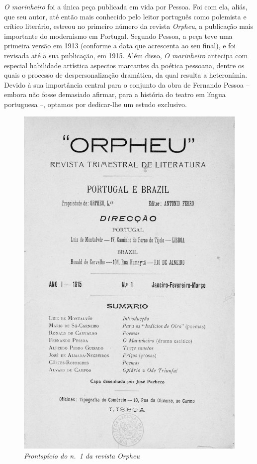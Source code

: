 \textit{O marinheiro} foi a única peça publicada em vida por Pessoa. Foi
com ela, aliás, que seu autor, até então mais conhecido pelo leitor
português como polemista e crítico literário, estreou no primeiro
número da revista \textit{Orpheu}, a publicação mais importante do
modernismo em Portugal. Segundo Pessoa, a peça teve uma primeira versão em 1913
(conforme a data que acrescenta ao seu final), e foi revisada até a sua
publicação, em 1915. Além disso, \textit{O marinheiro} antecipa com
especial habilidade artística aspectos marcantes da poética pessoana,
dentre os quais o processo de despersonalização dramática, da qual
resulta a heteronímia. Devido à sua importância central para o conjunto
da obra de Fernando Pessoa -- embora não fosse demasiado afirmar, para a
história do teatro em língua portuguesa --, optamos por dedicar-lhe um
estudo exclusivo. 
\renewcommand{\caption}[1]{{\small\textit{#1}}}
\begin{figure}
\includegraphics[width=\textwidth]{3.png}
\caption{Frontspício do n.~1 da revista \emph{Orpheu}}
\end{figure}

